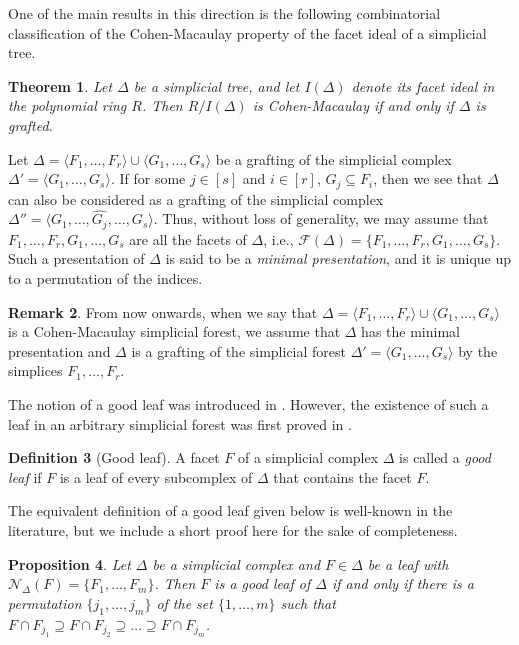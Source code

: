 \documentclass[12pt,a4paper,reqno]{amsart}
\newtheorem{proposition}{Proposition}[section]
\newtheorem{theorem}[proposition]{Theorem}
\theoremstyle{definition}
\newtheorem{remark}[proposition]{Remark}
\newtheorem{definition}[proposition]{Definition}
\def\D{\Delta}
\def\F{\mathcal{F}}
\def\N{\mathcal{N}}
\def\l{\langle}
\def\r{\rangle}
\begin{document}
One of the main results in this direction is the following combinatorial classification of the Cohen-Macaulay property of the facet ideal of a simplicial tree.

\begin{theorem}\label{CM forest theorem}\cite[Theorem 8.2, Corollary 7.8]{Faridi2005}
    Let $\D$ be a simplicial tree, and let $I(\D)$ denote its facet ideal in the polynomial ring $R$. Then $R/I(\D)$ is Cohen-Macaulay if and only if $\D$ is grafted.
\end{theorem}

Let $\Delta=\l F_1,\ldots,F_r\r\cup\l G_1,\ldots,G_s\r$ be a grafting of the simplicial complex $\Delta'=\l G_1,\ldots,G_s\r$. If for some $j\in[s]$ and $i\in[r]$, $G_j\subseteq F_i$, then we see that $\Delta$ can also be considered as a grafting of the simplicial complex $\Delta''=\l G_1,\ldots,\widehat{G_j},\ldots,G_s\r$. Thus, without loss of generality, we may assume that $F_1,\ldots,F_r,G_1,\ldots,G_s$ are all the facets of $\Delta$, i.e., $\F(\D)=\{F_1,\ldots,F_r,G_1,\ldots,G_s\}$. Such a presentation of $\Delta$ is said to be a \textit{minimal presentation}, and it is unique up to a permutation of the indices.

\begin{remark}\label{remark 2}
    From now onwards, when we say that $\Delta=\l F_1,\ldots,F_r\r\cup\l G_1,\ldots,G_s\r$ is a Cohen-Macaulay simplicial forest, we assume that $\Delta$ has the minimal presentation and $\Delta$ is a grafting of the simplicial forest $\Delta'=\l G_1,\ldots,G_s\r$ by the simplices $F_1,\ldots,F_r$. 
\end{remark}

The notion of a good leaf was introduced in \cite{CFS1}. However, the existence of such a leaf in an arbitrary simplicial forest was first proved in \cite{HHTX1}. 

\begin{definition}[Good leaf]
    A facet $F$ of a simplicial complex $\D$ is called a \textit{good leaf} if $F$ is a leaf of every subcomplex of $\D$ that contains the facet $F$. 
\end{definition}

The equivalent definition of a good leaf given below is well-known in the literature, but we include a short proof here for the sake of completeness.

\begin{proposition}\label{goof leaf prop}
    Let $\D$ be a simplicial complex and $F\in \D$ be a leaf with $\N_{\D}(F)=\{F_1,\ldots , F_m\}$. Then $F$ is a good leaf of $\D$ if and only if there is a permutation $\{j_1,\ldots,j_m\}$ of the set $\{1,\ldots,m\}$ such that $F\cap F_{j_1}\supseteq F\cap F_{j_2}\supseteq\dots\supseteq F\cap F_{j_m}$.
\end{proposition}
    
\end{document}
